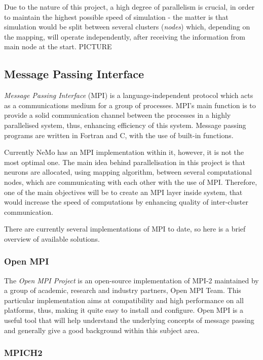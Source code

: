 Due to the nature of this project, a high degree of parallelism is crucial, in order to maintain the highest possible speed of simulation - the matter is that simulation would
be split between several clusters (\emph{nodes}) which, depending on the mapping, will operate independently, after receiving the information from main node at the start.
PICTURE

\subsection{Message Passing Interface}

\emph{Message Passing Interface} (MPI) is a language-independent protocol which acts as a communications medium for a group of processes.\cite{mpi} MPI's main function is to provide
a solid communication channel between the processes in a highly parallelised system, thus, enhancing efficiency of this system. Message passing programs are written in Fortran and 
C, with the use of built-in functions.

Currently NeMo has an MPI implementation within it, however, it is not the most optimal one. The main idea behind parallelisation in this project is that neurons are allocated, 
using mapping algorithm, between several computational nodes, which are communicating with each other with the use of MPI. Therefore, one of the main objectives will be to 
create an MPI layer inside system, that would increase the speed of computations by enhancing quality of inter-cluster communication.

There are currently several implementations of MPI to date, so here is a brief overview of available solutions.

\subsubsection{Open MPI}

The \emph{Open MPI Project} is an open-source implementation of MPI-2 maintained by a group of academic, research and industry partners, Open MPI Team.\cite{RichardL.Graham2005} This particular 
implementation aims at compatibility and high performance on all platforms, thus, making it quite easy to install and configure. Open MPI is a useful tool that will help understand 
the underlying concepts of message passing and generally give a good background within this subject area.

\subsubsection{MPICH2}

